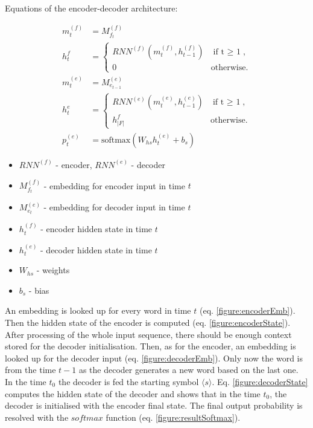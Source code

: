 \documentclass{ExcelAtFIT}
\begin{document}
\hfill \break
Equations of the encoder-decoder architecture:
\begin{linenomath}
\begin{align}
    m^{(f)}_{t}&=M^{(f)}_{f_t}\label{figure:encoderEmb} \\
    h^{f}_{t}&=\begin{cases}
                    RNN^{(f)}(m^{(f)}_{t},h^{(f)}_{t-1}) & \mbox{if t $\geq$ 1},\label{figure:encoderState} \\
                    0 & \mbox{otherwise}.
                \end{cases}\\
    m^{(e)}_{t}&=M^{(e)}_{e_{t-1}}\label{figure:decoderEmb} \\
    h^{e}_{t}&=\begin{cases}
                    RNN^{(e)}(m^{(e)}_{t},h^{(e)}_{t-1}) & \mbox{if t $\geq$ 1},\\
                    h^{f}_{|F|} & \mbox{otherwise}.
                \end{cases}\label{figure:decoderState} \\
    p^{(e)}_{t}&=\mbox{softmax}(W_{hs}h^{(e)}_{t} + b_{s}) \label{figure:resultSoftmax}
\end{align}
\end{linenomath}

\begin{itemize}
    \item $RNN^(f)$ - encoder, $RNN^(e)$ - decoder
    \item $M^{(f)}_{f_t}$ - embedding for encoder input in time $t$
    \item $M^{(e)}_{e_t}$ - embedding for decoder input in time $t$
    \item $h^{(f)}_t$ - encoder hidden state in time $t$
    \item $h^{(e)}_t$ - decoder hidden state in time $t$
    \item $W_{hs}$ - weights
    \item $b_s$ - bias
\end{itemize}


An embedding is looked up for every word in time $t$ (eq. \ref{figure:encoderEmb}). Then the hidden state of the encoder is computed (eq. \ref{figure:encoderState}). After processing of the whole input sequence, there should be enough context stored for the decoder initialisation. Then, as for the encoder, an embedding is looked up for the decoder input (eq. \ref{figure:decoderEmb}). Only now the word is from the time $t - 1$ as the decoder generates a new word based on the last one. In the time $t_0$ the decoder is fed the starting symbol $\langle s \rangle$. Eq. \ref{figure:decoderState} computes the hidden state of the decoder and shows that in the time $t_0$, the decoder is initialised with the encoder final state. The final output probability is resolved with the $softmax$ function (eq. \ref{figure:resultSoftmax}).
\end{document}
